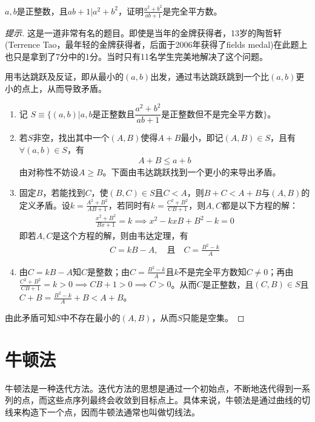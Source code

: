 \begin{example}[IMO 1988]
  $a,b$是正整数，且$ab + 1|a^2+b^2$，证明$\frac{a^2+b^2}{ab+1}$是完全平方数。
\end{example}
\begin{proof}[提示]
  这是一道非常有名的题目。即使是当年的金牌获得者，13岁的陶哲轩(Terrence Tao，最年轻的金牌获得者，后面于2006年获得了fields medal)在此题上也只是拿到了7分中的1分。当时只有11名学生完美地解决了这个问题。

  用韦达跳跃及反证，即从最小的$(a,b)$出发，通过韦达跳跃跳到一个比$(a,b)$更小的点上，从而导致矛盾。

  \begin{enumerate}
  \item 记 $S\equiv \{(a,b)|a,b\text{是正整数且}\dfrac{a^2+b^2}{ab+1}\text{是正整数但不是完全平方数}\}$。
  \item 若$S$非空，找出其中一个$(A,B)$使得$A+B$最小，即记$(A,B)\in S$，且有$\forall (a,b)\in S$，有
    \begin{align*}
      A + B \le a + b
    \end{align*}
    由对称性不妨设$A\ge B$。下面由韦达跳跃找到一个更小的来导出矛盾。
  \item 固定$B$，若能找到$C$，使$(B,C)\in S$且$C<A$，则$B+C<A+B$与$(A,B)$的定义矛盾。设$k = \frac{A^2+B^2}{AB+1}$，若同时有$k = \frac{C^2+B^2}{CB+1}$，则$A,C$都是以下方程的解：
    \begin{align*}
      \frac{x^2 + B^2}{Bx + 1} = k \implies x^2 - kxB + B^2 - k = 0
    \end{align*}
    即若$A,C$是这个方程的解，则由韦达定理，有
    \begin{align*}
      C = kB - A, \quad\text{且}\quad C = \frac{B^2 - k}{A}
    \end{align*}

  \item 由$C=kB - A$知$C$是整数；由$C = \frac{B^2 - k}{A}$且$k$不是完全平方数知$C\ne 0$；再由$\frac{C^2 + B^2}{CB + 1}=k>0 \implies CB+1>0 \implies C>0$。从而$C$是正整数，且$(C,B)\in S$且$C+B = \frac{B^2-k}{A} + B < A + B$。
  \end{enumerate}
  由此矛盾可知$S$中不存在最小的$(A,B)$，从而$S$只能是空集。
\end{proof}


\section{牛顿法}
\label{sec:Newton-method}

牛顿法是一种迭代方法。迭代方法的思想是通过一个初始点，不断地迭代得到一系列的点，而这些点序列最终会收敛到目标点上。具体来说，牛顿法是通过曲线的切线来构造下一个点，因而牛顿法通常也叫做切线法。

